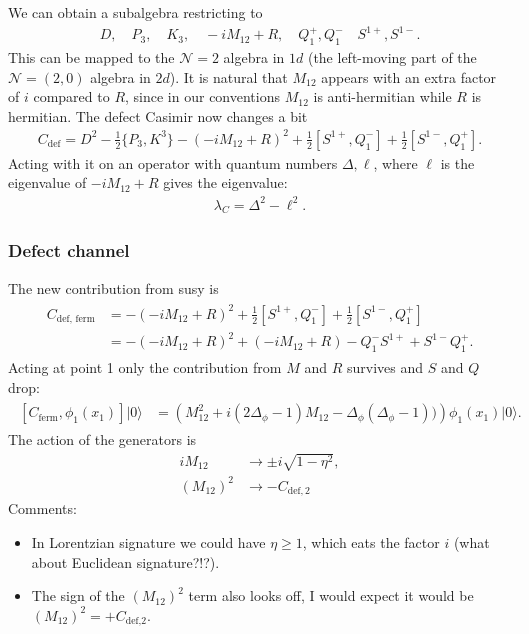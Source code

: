 \documentclass[letterpaper]{article}
\let\Oldsubsubsection\subsubsection
\renewcommand{\subsubsection}{\FloatBarrier\Oldsubsubsection}
\def\Nm{{\mathcal{N}}}
\begin{document}
We can obtain a subalgebra restricting to
\begin{align}
 D, \quad
 P_3, \quad
 K_3, \quad
 -iM_{12} + R, \quad
 Q^+_1, Q^-_1 \quad
 S^{1+}, S^{1-}.
\end{align}
This can be mapped to the $\Nm = 2$ algebra in $1d$ (the left-moving part of the $\Nm = (2,0)$ algebra in $2d$).
It is natural that $M_{12}$ appears with an extra factor of $i$ compared to $R$, since in our conventions $M_{12}$ is anti-hermitian while $R$ is hermitian.
The defect Casimir now changes a bit
\begin{align}
 C_{\text{def}} = 
    D^2
  - \frac12 \{ P_{3}, K^{3} \}
  - (-iM_{12} + R)^2
  + \frac12 [ S^{1+}, Q^-_1]
  + \frac12 [ S^{1-}, Q^+_1].
\end{align}
Acting with it on an operator with quantum numbers $\Delta, \ell$, where $\ell$ is the eigenvalue of $-i M_{12} + R$ gives the eigenvalue:
\begin{align}
 \lambda_C 
 = \Delta^2
 - \ell^2.
\end{align}

\subsubsection{Defect channel}

The new contribution from susy is
\begin{align}
\begin{split}
 C_{\text{def, ferm}} 
 & = 
  - (-i M_{12} + R)^2
  + \frac12 [ S^{1+}, Q^-_1]
  + \frac12 [ S^{1-}, Q^+_1] \\
 & =
  - (-iM_{12} + R)^2
  + (-iM_{12} + R)
  - Q^-_1 S^{1+}
  + S^{1-} Q^+_1.
\end{split}
\end{align}
Acting at point 1 only the contribution from $M$ and $R$ survives and $S$ and $Q$ drop:
\begin{align}
\begin{split}
 [C_{\text{ferm}}, \phi_1(x_1) ] |0\rangle
 & = \left(   
      M_{12}^2 
    + i (2\Delta_\phi -1) M_{12}
    - \Delta_\phi(\Delta_\phi -1) ) 
 \right) \phi_1(x_1) |0\rangle.
\end{split}
\end{align}
The action of the generators is
\begin{align}
 i M_{12}   & \to \pm i \sqrt{1-\eta^2}, \\
 (M_{12})^2 & \to - C_{\text{def},2}
\end{align}
Comments:
\begin{itemize}
 \item In Lorentzian signature we could have $\eta \ge 1$, which eats the factor $i$ (what about Euclidean signature?!?).
 \item The sign of the $(M_{12})^2$ term also looks off, I would expect it would be $(M_{12})^2 = +C_{\text{def,2}}$.
\end{itemize}
\end{document}
